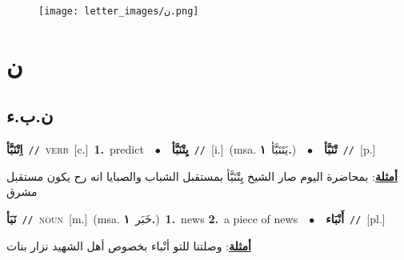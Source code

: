 \documentclass[10pt,a4paper,twoside]{article} %
\begin{document}
\begin{figure*}[t!]\centering\texttt{[image: letter\_images/ن.png]}\end{figure*}
\color{white}

 \section*{\foreignlanguage{arabic}{ن}} 
 \begin{multicols}{2} 

%
\color{black}
\vspace{-3mm}
\subsection*{\color{blue}\foreignlanguage{arabic}{ن.ب.ء}\color{blue}{}} 

{\setlength\topsep{0pt}\textbf{\foreignlanguage{arabic}{اِتْنَبَّأ}}\ {\color{gray}\texttt{//}\color{black}}\ \textsc{verb}\ [c.]\ \textbf{1.}~predict\ \ $\bullet$\ \ \setlength\topsep{0pt}\textbf{\foreignlanguage{arabic}{يِتْنَبَّأ}}\ {\color{gray}\texttt{//}\color{black}}\ [i.]\ \color{gray}(msa. \foreignlanguage{arabic}{يَتَنَبَّأ}~\foreignlanguage{arabic}{\textbf{١.}})\color{black}\ \ $\bullet$\ \ \setlength\topsep{0pt}\textbf{\foreignlanguage{arabic}{تْنَبَّأ}}\ {\color{gray}\texttt{//}\color{black}}\ [p.]\  \begin{flushright}\color{gray}\foreignlanguage{arabic}{\textbf{\underline{\foreignlanguage{arabic}{أمثلة}}}: بمحاضرة اليوم صار الشيخ يِتْنَبَّأ بمستقبل الشباب والصبايا انه رح يكون مستقبل مشرق}\end{flushright}\color{black}} \vspace{2mm}

{\setlength\topsep{0pt}\textbf{\foreignlanguage{arabic}{نَبَأ}}\ {\color{gray}\texttt{//}\color{black}}\ \textsc{noun}\ [m.]\ \color{gray}(msa. \foreignlanguage{arabic}{خَبَر}~\foreignlanguage{arabic}{\textbf{١.}})\color{black}\ \textbf{1.}~news  \textbf{2.}~a piece of news\ \ $\bullet$\ \ \setlength\topsep{0pt}\textbf{\foreignlanguage{arabic}{أَنْبَاء}}\ {\color{gray}\texttt{//}\color{black}}\ [pl.]\  \begin{flushright}\color{gray}\foreignlanguage{arabic}{\textbf{\underline{\foreignlanguage{arabic}{أمثلة}}}: وصلتنا للتو أنْباء بخصوص أهل الشهيد نزار بنات}\end{flushright}\color{black}} \vspace{2mm}


\end{multicols}
\end{document}
